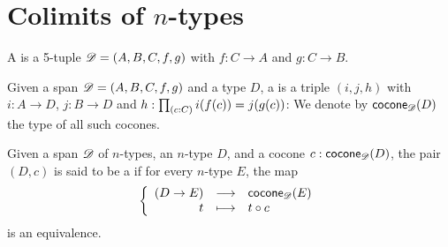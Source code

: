\documentclass[hott-all.tex]{subfiles}
\begin{document}
\section{Colimits of \texorpdfstring{$n$}{n}-types}
% 
% 
% 
\begin{defn}
  A  %
  is a 5-tuple $\mathscr{D}=(A,B,C,f,g)$ with %
  $f:C\to{}A$ and $g:C\to{}B$.
\end{defn}
% 
\begin{defn}
  Given a span $\mathscr{D}=(A,B,C,f,g)$ and a type $D$, a %
   is a triple $(i, j, h)$
  with $i:A\to{}D$, $j:B\to{}D$ and $h : \prd{c:C}i(f(c))=j(g(c))$:
  We denote by $\mathsf{cocone}_{\mathscr{D}}(D)$ the type of all such cocones.
\end{defn}
% 
% 
\begin{defn}
  Given a span $\mathscr{D}$ of $n$-types, an $n$-type $D$, and a cocone
  $c:\mathsf{cocone}_{\mathscr{D}}(D)$, the pair $(D,c)$ is said to be a 
  if for every $n$-type $E$, the map
  \[\left\{\begin{array}{rcl}(D\to{}E) & \longrightarrow & \mathsf{cocone}_{\mathscr{D}}(E) \\ t & \longmapsto & t\circ c \end{array}\right.\]
  is an equivalence.
\end{defn}
\end{document}
